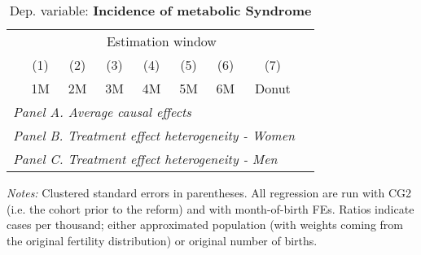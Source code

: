  \begin{table}[H] \begin{threeparttable} \centering \caption{Dep. variable: \textbf{Incidence of metabolic Syndrome}} {\def\sym#1{\ifmmode^{#1}\else\(^{#1}\)\fi} \begin{tabular}{l*{8}{c}} \toprule & \multicolumn{7}{c}{Estimation window} \\ \cmidrule(lr){2-8}
            &\multicolumn{1}{c}{(1)}&\multicolumn{1}{c}{(2)}&\multicolumn{1}{c}{(3)}&\multicolumn{1}{c}{(4)}&\multicolumn{1}{c}{(5)}&\multicolumn{1}{c}{(6)}&\multicolumn{1}{c}{(7)}\\
            &\multicolumn{1}{c}{1M}&\multicolumn{1}{c}{2M}&\multicolumn{1}{c}{3M}&\multicolumn{1}{c}{4M}&\multicolumn{1}{c}{5M}&\multicolumn{1}{c}{6M}&\multicolumn{1}{c}{Donut}\\
\midrule
 \multicolumn{8}{l}{\emph{Panel A. Average causal effects}} \\       \midrule\multicolumn{8}{l}{\emph{Panel B. Treatment effect heterogeneity - Women}} \\       \midrule\multicolumn{8}{l}{\emph{Panel C. Treatment effect heterogeneity - Men}} \\       
\bottomrule \end{tabular} } \begin{tablenotes} \item \scriptsize \emph{Notes:} Clustered standard errors in parentheses. All regression are run with CG2 (i.e. the cohort prior to the reform) and with month-of-birth FEs. Ratios indicate cases per thousand; either approximated population (with weights coming from the original fertility distribution) or original number of births. \end{tablenotes} \end{threeparttable} \end{table} 
